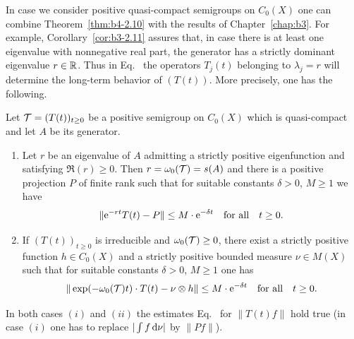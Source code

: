 In case we consider positive quasi-compact semigroups on $C_{0}(X)$ one can combine Theorem~\ref{thm:b4-2.10} with the results of Chapter~\ref{chap:b3}. 
For example, Corollary~\ref{cor:b3-2.11} assures that, in case there is at least one eigenvalue with nonnegative real part, the generator has a strictly dominant eigenvalue $r \in \mathbb{R}$. 
Thus in Eq.~ the operators $T_j(t)$ belonging to $\lambda_j = r$ will determine the long-term behavior of\/ $(T(t))$. More precisely, one has the following.
\begin{corollary}\label{cor:b4-2.11}%
%
Let $\TT = (T(t))_{t \geq 0}$ be a positive semigroup on $C_{0}(X)$ which is quasi-compact and let $A$ be its generator.
\begin{enumerate}[\upshape (i)]
	\item	
	Let $r$ be an eigenvalue of\/ $A$ admitting a strictly positive eigenfunction and satisfying $\Re(r) \geq 0$. 
    Then $r = \omega_{0}(\mathcal{T}) = s(A)$ and there is a positive projection $P$ of finite rank such that for suitable constants $\delta > 0$, $M \geq 1$ we have
	\begin{equation}\label{eq:b4-2.6}
		\|\eu^{-rt}T(t) - P\| \leq M \cdot \eu^{-\delta t} \quad \text{for all} \quad t \geq 0 \text{.}
	\end{equation}
	
	\item 
	If\/ $(T(t))_{t \geq 0}$ is irreducible and $\omega_{0}(\TT) \geq 0$, there exist a strictly positive function $h \in C_{0}(X)$ and a strictly positive bounded measure $\nu \in M(X)$ such that for suitable constants $\delta > 0$, $M \geq 1$ one has
	\begin{equation}\label{eq:b4-2.7}
		\|\exp(-\omega_{0}(\TT)t) \cdot T(t) - \nu \otimes h\| \leq M \cdot \eu^{-\delta t} \quad \text{for all} \quad t \geq 0 \text{.}
	\end{equation}
\end{enumerate}
In both cases $(i)$ and $(ii)$ the estimates Eq.~ for $\|T(t)f\|$ hold true (in case $(i)$ one has to replace $|\int f \mathop{}\!\mathrm{d}{\nu}|$ by $\|Pf\|$).
\end{corollary}
